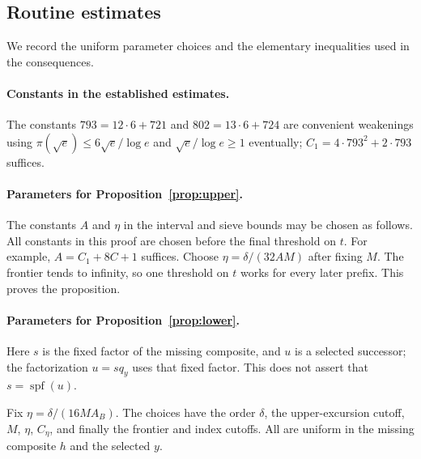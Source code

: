 \documentclass[11pt]{article}
\theoremstyle{remark}
\newcommand{\spf}{\operatorname{spf}}
\begin{document}
\clearpage
\begin{appendices}
\section{Routine estimates}\label{sec:uniform-details}
We record the uniform parameter choices and the elementary inequalities
used in the consequences.

\paragraph{Constants in the established estimates.}
The constants $793=12\cdot6+721$ and $802=13\cdot6+724$ are convenient
weakenings using $\pi(\sqrt e)\leq6\sqrt e/\log e$ and
$\sqrt e/\log e\geq1$ eventually; $C_1=4\cdot793^2+2\cdot793$ suffices.

\paragraph{Parameters for Proposition~\ref{prop:upper}.}\label{detail-uniform-2}
The constants $A$ and $\eta$ in the interval and sieve bounds may be chosen
as follows.
All constants in this proof are chosen before the
final threshold on $t$. %
For example, $A=C_1+8C+1$ suffices.
Choose $\eta=\delta/(32AM)$ after fixing $M$. %
The frontier tends to infinity, so one threshold
on $t$ works for every later prefix. This proves the proposition.%

\paragraph{Parameters for Proposition~\ref{prop:lower}.}\label{detail-uniform-3}
Here $s$ is the fixed factor of the missing composite, and $u$ is a
selected successor; the factorization $u=sq_y$ uses that fixed factor.
This does not assert that
$s=\spf(u)$.%

Fix $\eta=\delta/(16MA_B)$. %
The choices have the order $\delta$, the upper-excursion cutoff,
$M$, $\eta$, $C_\eta$, and finally the frontier and index cutoffs.
All are uniform in the missing composite $h$ and the selected $y$.%


\end{appendices}
\end{document}
